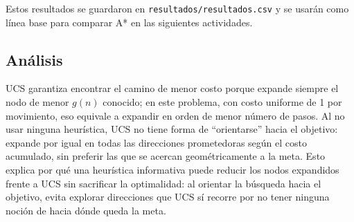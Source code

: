 Estos resultados se guardaron en \texttt{resultados/resultados.csv} y se usarán como línea base
para comparar A* en las siguientes actividades.

\subsection{Análisis}

UCS garantiza encontrar el camino de menor costo porque expande siempre el nodo de menor $g(n)$
conocido; en este problema, con costo uniforme de 1 por movimiento, eso equivale a expandir en
orden de menor número de pasos. Al no usar ninguna heurística, UCS no tiene forma de
``orientarse'' hacia el objetivo: expande por igual en todas las direcciones prometedoras según el costo
acumulado, sin preferir las que se acercan geométricamente a la meta. Esto explica por qué una
heurística informativa puede reducir los nodos expandidos frente a UCS sin sacrificar la
optimalidad: al orientar la búsqueda hacia el objetivo, evita explorar direcciones que UCS sí
recorre por no tener ninguna noción de hacia dónde queda la meta.
